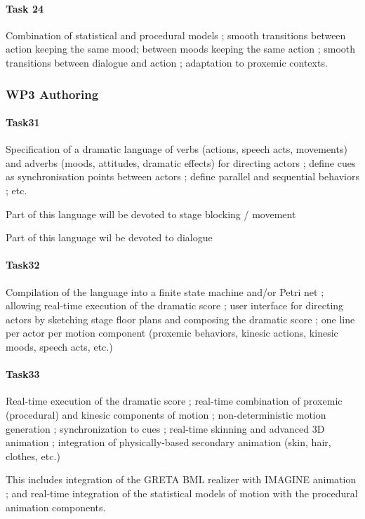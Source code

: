 \paragraph{Task 24}  Combination of statistical and procedural models ; smooth transitions between action keeping the same mood; between moods keeping the same action ; smooth transitions between dialogue and action ; adaptation to proxemic contexts.


\subsubsection{WP3 Authoring}

\paragraph{Task31} Specification of a dramatic language of verbs (actions, speech acts, movements) and adverbs (moods, attitudes, dramatic effects) for directing actors ; define cues as synchronisation points between actors ; define parallel and sequential behaviors ; etc.

Part of this language will be devoted to stage blocking / movement

Part of this language wil be devoted to dialogue

\paragraph{Task32}  Compilation of the language into a finite state machine and/or Petri net ; allowing real-time execution of the dramatic score ; user interface for directing actors by sketching stage floor plans and composing the dramatic score ; one line per actor per motion component (proxemic behaviors, kinesic actions, kinesic moods, speech acts, etc.)

\paragraph{Task33} Real-time execution of the dramatic score ; real-time combination of proxemic (procedural) and kinesic components of motion ; non-deterministic motion generation ; synchronization to cues ; real-time skinning and advanced 3D animation ; integration of physically-based secondary animation (skin, hair, clothes, etc.)

This includes integration of the GRETA BML realizer with IMAGINE animation ; and real-time integration of the statistical models of motion with the procedural animation components.


